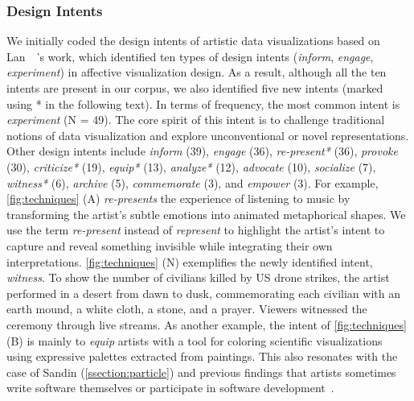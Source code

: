 \subsubsection{Design Intents}
\label{sssec:intents}

We initially coded the design intents of artistic data visualizations based on Lan~\etal~\cite{lan2023affective}'s work, which identified ten types of design intents (\eg \textit{inform}, \textit{engage}, \textit{experiment}) in affective visualization design.
As a result, although all the ten intents are present in our corpus, we also identified five new intents (marked using * in the following text).
In terms of frequency, the most common intent is \textit{experiment} (N = 49).
The core spirit of this intent is to challenge traditional notions of data visualization and explore unconventional or novel representations.
Other design intents include \textit{inform} (39), \textit{engage} (36), \textit{re-present*} (36), \textit{provoke} (30), \textit{criticize*} (19),  \textit{equip*} (13), \textit{analyze*} (12), \textit{advocate} (10), \textit{socialize} (7), \textit{witness*} (6), \textit{archive} (5), \textit{commemorate} (3), and \textit{empower} (3). 
For example, 
\autoref{fig:techniques} (A) \textit{re-presents} the experience of listening to music by transforming the artist's subtle emotions into animated metaphorical shapes. We use the term \textit{re-present} instead of \textit{represent} to highlight the artist's intent to capture and reveal something invisible while integrating their own interpretations.
\autoref{fig:techniques} (N) exemplifies the newly identified intent, \textit{witness}. To show the number of civilians killed by US drone strikes, the artist performed in a desert from dawn to dusk, commemorating each civilian with an earth mound, a white cloth, a stone, and a prayer. Viewers witnessed the ceremony through live streams.
As another example, the intent of \autoref{fig:techniques} (B) is mainly to \textit{equip} artists with a tool for coloring scientific visualizations using expressive palettes extracted from paintings. This also resonates with the case of Sandin (\autoref{ssection:particle}) and previous findings that artists sometimes write software themselves or participate in software development~\cite{li2021we}.


